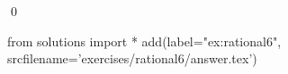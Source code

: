 
\begin{ex} 
  \label{ex:rational6}
  
  \qed
\end{ex} 
\begin{python0}
from solutions import *
add(label="ex:rational6",
    srcfilename='exercises/rational6/answer.tex') 
\end{python0}
